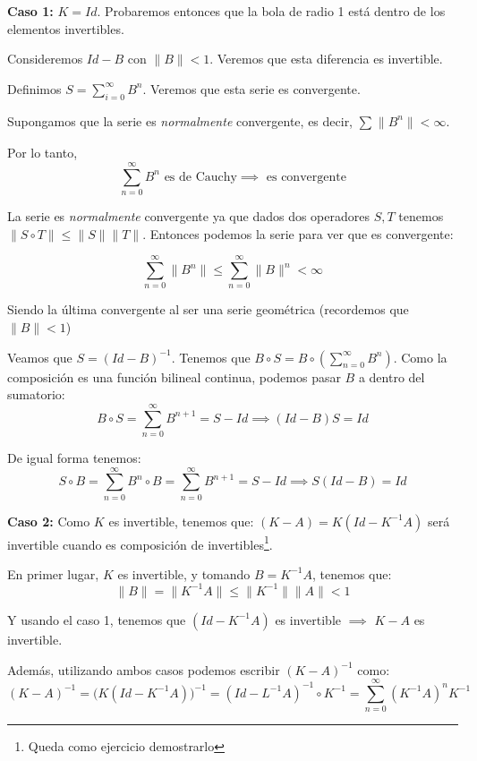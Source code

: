 \documentclass[openany]{book}
\begin{document}
\begin{demonstration}
    \textbf{Caso 1:} $ K = Id$. Probaremos entonces que la bola de radio 1 está dentro de los elementos invertibles.

    Consideremos $ Id-B$ con $ \|B\|<1$. Veremos que esta diferencia es invertible. 

    Definimos $ S = \sum\limits_{i=0}^{\infty} B^{n}$. Veremos que esta serie es convergente.

    Supongamos que la serie es \textit{normalmente} convergente, es decir, $ \sum\limits_{}^{} \|B^{n}\| < \infty$.
    
    Por lo tanto,
    $$ \sum\limits_{n=0}^{\infty}B^{n} \text{ es de Cauchy} \implies \text{ es convergente} $$ 

    La serie es \textit{normalmente} convergente ya que dados dos operadores $ S,T$ tenemos $ \| S \circ T \| \leq  \|S\|\|T\|$. Entonces podemos la serie para ver que es convergente:

    $$ \sum\limits_{n=0}^{\infty}\|B^{n}\| \leq  \sum\limits_{n=0}^{\infty}\|B\|^{n} < \infty $$

    Siendo la última convergente al ser una serie geométrica (recordemos que $ \|B\| < 1$)


    Veamos que $ S = (Id-B) ^{-1}$. Tenemos que $ B \circ S = B \circ \left(\sum\limits_{n=0}^{\infty}B^{n}\right)$. Como la composición es una función bilineal continua, podemos pasar $ B$ a dentro del sumatorio:
    $$ B \circ S= \sum\limits_{n=0}^{\infty} B^{n+1} = S - Id \implies (Id - B) S = Id$$

    De igual forma tenemos:
    $$ S \circ B = \sum\limits_{n=0}^{\infty}B^{n} \circ B = \sum\limits_{n=0}^{\infty} B^{n+1} = S - Id \implies S(Id - B) = Id $$

    \textbf{Caso 2:} Como $ K$ es invertible, tenemos que:  $(K-A) = K (Id - K ^{-1} A) $ será invertible cuando es composición de invertibles\footnote{Queda como ejercicio demostrarlo}.

    En primer lugar, $ K$ es invertible, y tomando $ B = K ^{-1}A$, tenemos que:
    $$ \|B\| = \|K ^{-1}A\| \leq  \|K ^{-1}\| \|A\| < 1 $$

    Y usando el caso 1, tenemos que $ (Id - K ^{-1} A)$ es invertible $ \implies $ $ K-A$ es invertible.

    Además, utilizando ambos casos podemos escribir $ (K-A) ^{-1}$ como:
    \begin{equation}
        (K - A)^{-1} = \Big ( K (Id-K ^{-1} A) \Big) ^{-1} = (Id - L ^{-1}A) ^{-1} \circ K ^{-1} = \sum\limits_{n=0}^{\infty} (K ^{-1} A)^{n} K^{-1}
        \label{calc inv}
        \end{equation}
    

\end{demonstration}
\end{document}
